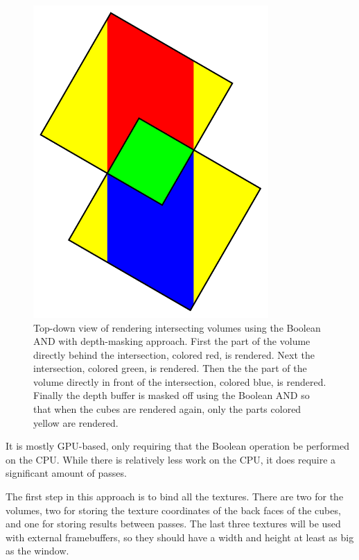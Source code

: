 \documentclass{report}
\begin{document}
\begin{figure}
\centering
\includegraphics[width=0.8\textwidth]{boolean-and.pdf}
\caption{
Top-down view of rendering intersecting volumes using the Boolean AND with
depth-masking approach.  First the part of the volume directly behind the
intersection, colored red, is rendered.  Next the intersection, colored green,
is rendered.  Then the the part of the volume directly in front of the
intersection, colored blue, is rendered.  Finally the depth buffer is masked off
using the Boolean AND so that when the cubes are rendered again, only the parts
colored yellow are rendered.
}
\label{boolean-and}
\end{figure}

It is mostly GPU-based, only requiring that the Boolean operation be performed
on the CPU.  While there is relatively less work on the CPU, it does require a
significant amount of passes.

The first step in this approach is to bind all the textures.  There are two for
the volumes, two for storing the texture coordinates of the back faces of the
cubes, and one for storing results between passes.  The last three textures will
be used with external framebuffers, so they should have a width and height at
least as big as the window.
\end{document}
